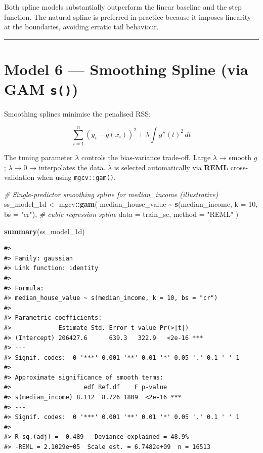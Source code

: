 \documentclass[
]{article}
\newenvironment{Shaded}{\begin{snugshade}}{\end{snugshade}}
\newcommand{\AttributeTok}[1]{\textcolor[rgb]{0.13,0.29,0.53}{#1}}
\newcommand{\CommentTok}[1]{\textcolor[rgb]{0.56,0.35,0.01}{\textit{#1}}}
\newcommand{\DecValTok}[1]{\textcolor[rgb]{0.00,0.00,0.81}{#1}}
\newcommand{\FunctionTok}[1]{\textcolor[rgb]{0.13,0.29,0.53}{\textbf{#1}}}
\newcommand{\NormalTok}[1]{#1}
\newcommand{\OtherTok}[1]{\textcolor[rgb]{0.56,0.35,0.01}{#1}}
\newcommand{\SpecialCharTok}[1]{\textcolor[rgb]{0.81,0.36,0.00}{\textbf{#1}}}
\newcommand{\StringTok}[1]{\textcolor[rgb]{0.31,0.60,0.02}{#1}}
\begin{document}
Both spline models substantially outperform the linear baseline and the
step function. The natural spline is preferred in practice because it
imposes linearity at the boundaries, avoiding erratic tail behaviour.

\begin{center}\rule{0.5\linewidth}{0.5pt}\end{center}

\section{\texorpdfstring{Model 6 --- Smoothing Spline (via GAM
\texttt{s()})}{Model 6 --- Smoothing Spline (via GAM s())}}\label{smoothing-spline}

Smoothing splines minimise the penalised RSS:

\[\sum_{i=1}^{n}(y_i - g(x_i))^2 + \lambda \int g''(t)^2 \, dt\]

The tuning parameter \(\lambda\) controls the bias-variance trade-off.
Large \(\lambda\) → smooth \(g\); \(\lambda \to 0\) → interpolates the
data. \(\lambda\) is selected automatically via \textbf{REML}
cross-validation when using \texttt{mgcv::gam()}.

\begin{Shaded}
\begin{Highlighting}[]
\CommentTok{\# Single{-}predictor smoothing spline for median\_income (illustrative)}
\NormalTok{ss\_model\_1d }\OtherTok{\textless{}{-}}\NormalTok{ mgcv}\SpecialCharTok{::}\FunctionTok{gam}\NormalTok{(}
\NormalTok{  median\_house\_value }\SpecialCharTok{\textasciitilde{}} \FunctionTok{s}\NormalTok{(median\_income, }\AttributeTok{k =} \DecValTok{10}\NormalTok{, }\AttributeTok{bs =} \StringTok{"cr"}\NormalTok{),  }\CommentTok{\# cubic regression spline}
  \AttributeTok{data   =}\NormalTok{ train\_sc,}
  \AttributeTok{method =} \StringTok{"REML"}
\NormalTok{)}

\FunctionTok{summary}\NormalTok{(ss\_model\_1d)}
\end{Highlighting}
\end{Shaded}

\begin{verbatim}
#> 
#> Family: gaussian 
#> Link function: identity 
#> 
#> Formula:
#> median_house_value ~ s(median_income, k = 10, bs = "cr")
#> 
#> Parametric coefficients:
#>             Estimate Std. Error t value Pr(>|t|)    
#> (Intercept) 206427.6      639.3   322.9   <2e-16 ***
#> ---
#> Signif. codes:  0 '***' 0.001 '**' 0.01 '*' 0.05 '.' 0.1 ' ' 1
#> 
#> Approximate significance of smooth terms:
#>                    edf Ref.df    F p-value    
#> s(median_income) 8.112  8.726 1809  <2e-16 ***
#> ---
#> Signif. codes:  0 '***' 0.001 '**' 0.01 '*' 0.05 '.' 0.1 ' ' 1
#> 
#> R-sq.(adj) =  0.489   Deviance explained = 48.9%
#> -REML = 2.1029e+05  Scale est. = 6.7482e+09  n = 16513
\end{verbatim}
\end{document}
